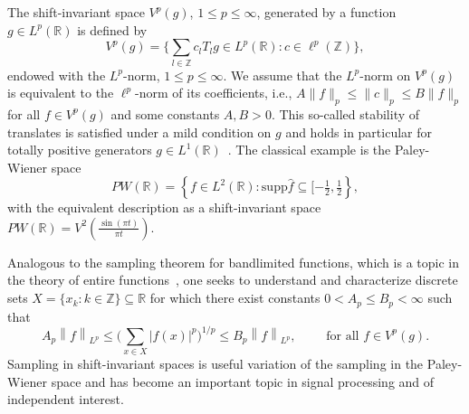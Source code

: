 \documentclass[reqno,a4paper,12pt]{amsart}
\numberwithin{equation}{section}
\def\Z{{\mathbb Z}}
\def\R{{\mathbb R}}
\newcommand{\supp}{{\mathrm{supp}}}
\newcommand\1{\mathds{1}}
\newcommand{\norm}[1]{\left\lVert #1 \right\rVert}
\begin{document}
The  shift-invariant space $V^p(g)$, $1\leq p \leq \infty$,  generated by a function $g\in
L^p(\R)$ is defined by 
\begin{equation}
    V^p(g) = \Big\{ \sum\limits_{l\in\Z} c_l T_l g \in L^p(\R): c\in \ell^p(\Z)\Big\},
\end{equation}
endowed with the $L^p$-norm, $1\leq p\leq \infty$. We assume that the
$L^p$-norm on $V^p(g)$ is equivalent to the $\ell ^p$-norm of its
coefficients, i.e., $ A \|f\|_p \leq \|c\|_p \leq B \|f\|_p$ for all
$f\in V^p(g)$ and some constants $A,B>0$. This so-called stability of
translates is satisfied under a mild condition on $g$ and holds in
particular for totally positive generators $g\in L^1(\R
)$~\cite{GroechenigStoeckler2013}. The classical example is the Paley-Wiener space
\begin{equation}
    PW(\R) = \left\{f\in L^2(\R): \supp \hat{f}\subseteq [-\tfrac{1}{2},\tfrac{1}{2}\right\},
\end{equation}
with the equivalent description as a shift-invariant space $PW(\R) =
V^2(\tfrac{\sin(\pi t )}{\pi t})$. 

Analogous to the sampling theorem for bandlimited functions, which is
a topic in the theory of entire functions~\cite{seipBook}, one seeks
to understand and characterize discrete sets $X = \{x_k:k\in\Z\}\subseteq \R $ for
which %
there exist constants $0<A_p\leq B_p<\infty$ such that
\begin{equation}\label{eq:def:sampling_set}
  A_p \norm{f}_{L^p} \leq \Big( \sum _{x\in X} |f(x)|^p \Big)^{1/p} \leq  B_p  \norm{f}_{L^p}
,\qquad  \text{ for all } f\in V^p(g).
\end{equation}
Sampling in shift-invariant spaces is  useful variation of the
sampling in the Paley-Wiener space  and has become an important topic in signal
processing and of independent interest.
\end{document}
